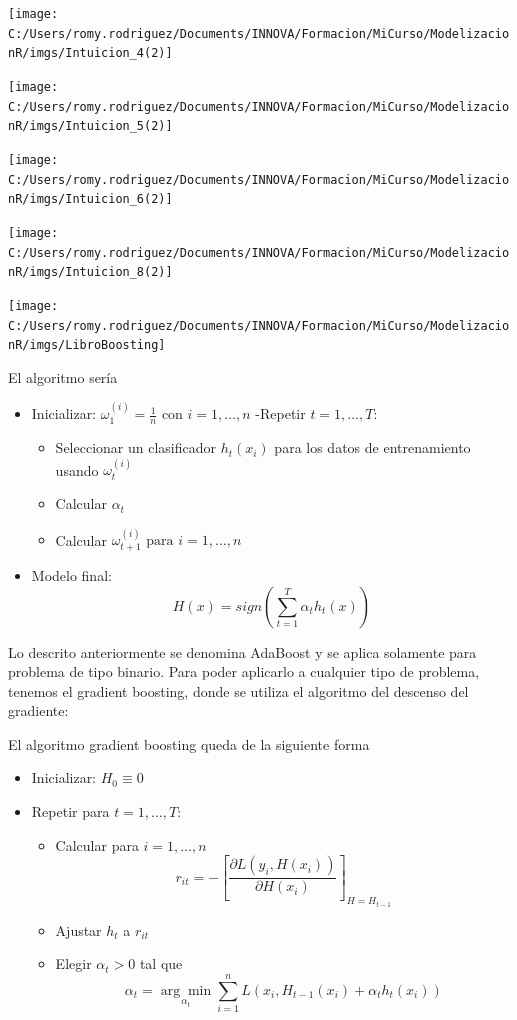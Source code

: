 \documentclass[]{book}
\providecommand{\tightlist}{%
  \setlength{\itemsep}{0pt}\setlength{\parskip}{0pt}}
\begin{document}
\texttt{[image: C:/Users/romy.rodriguez/Documents/INNOVA/Formacion/MiCurso/ModelizacionR/imgs/Intuicion\_4(2)]}

\texttt{[image: C:/Users/romy.rodriguez/Documents/INNOVA/Formacion/MiCurso/ModelizacionR/imgs/Intuicion\_5(2)]}

\texttt{[image: C:/Users/romy.rodriguez/Documents/INNOVA/Formacion/MiCurso/ModelizacionR/imgs/Intuicion\_6(2)]}

\texttt{[image: C:/Users/romy.rodriguez/Documents/INNOVA/Formacion/MiCurso/ModelizacionR/imgs/Intuicion\_8(2)]}

\texttt{[image: C:/Users/romy.rodriguez/Documents/INNOVA/Formacion/MiCurso/ModelizacionR/imgs/LibroBoosting]}

El algoritmo sería

\begin{itemize}
\tightlist
\item
  Inicializar: \(\omega_1^{(i)}=\frac{1}{n} \text{ con } i = 1, \ldots , n\)
  -Repetir \(t = 1, \ldots, T\):

  \begin{itemize}
  \tightlist
  \item
    Seleccionar un clasificador \(h_t(x_i)\) para los datos de entrenamiento usando \(\omega_t^{(i)}\)
  \item
    Calcular \(\alpha_t\)
  \item
    Calcular \(\omega_{t+1}^{(i)} \text{ para } i = 1, \ldots, n\)
  \end{itemize}
\item
  Modelo final:
  \[H(x) = sign\left(\sum_{t=1}^T\alpha_th_t(x)\right)\]
\end{itemize}

Lo descrito anteriormente se denomina AdaBoost y se aplica solamente para problema de tipo binario. Para poder aplicarlo a cualquier tipo de problema, tenemos el gradient boosting, donde se utiliza el algoritmo del descenso del gradiente:

El algoritmo gradient boosting queda de la siguiente forma

\begin{itemize}
\tightlist
\item
  Inicializar: \(H_0 \equiv 0\)
\item
  Repetir para \(t = 1, \ldots, T\):

  \begin{itemize}
  \tightlist
  \item
    Calcular para \(i = 1, \ldots, n\)
    \[r_{it}=-\left[ \frac{\partial L(y_i, H(x_i))}{\partial H(x_i)}\right]_{H=H_{t-1}}\]
  \item
    Ajustar \(h_t\) a \(r_{it}\)
  \item
    Elegir \(\alpha_t >0\) tal que
    \[\alpha_t = \underset{\alpha_t}{\arg\min} \sum_{i= 1}^n L(x_i, H_{t-1}(x_i)+\alpha_th_t(x_i))\]
  \end{itemize}
\end{itemize}
\end{document}

